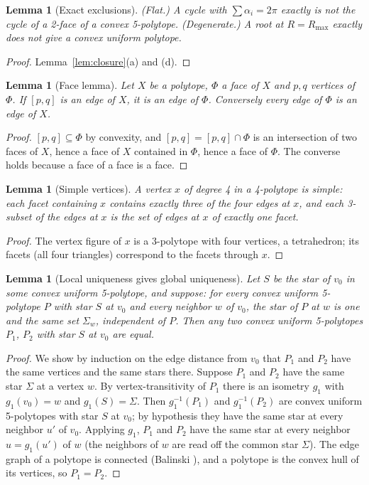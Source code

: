 \documentclass[11pt]{article}
\newtheorem{lemma}[theorem]{Lemma}
\theoremstyle{definition}
\theoremstyle{remark}
\begin{document}
\begin{appendices}
\begin{lemma}[Exact exclusions]\label{lem:exclusions}
\textup{(Flat.)} A cycle with $\sum\alpha_i=2\pi$ exactly is not the cycle
of a 2-face of a convex 5-polytope. \textup{(Degenerate.)} A root at
$R=R_{\max}$ exactly does not give a convex uniform polytope.
\end{lemma}
\begin{proof}
Lemma~\ref{lem:closure}(a) and (d).
\end{proof}


\begin{lemma}[Face lemma]\label{lem:face}
Let $X$ be a polytope, $\Phi$ a face of $X$ and $p,q$ vertices of
$\Phi$. If $[p,q]$ is an edge of $X$, it is an edge of $\Phi$. Conversely
every edge of $\Phi$ is an edge of $X$.
\end{lemma}
\begin{proof}
$[p,q]\subseteq\Phi$ by convexity, and $[p,q]=[p,q]\cap\Phi$ is an
intersection of two faces of $X$, hence a face of $X$ contained in
$\Phi$, hence a face of $\Phi$. The converse holds because a face of a
face is a face.
\end{proof}


\begin{lemma}[Simple vertices]\label{lem:simple}
A vertex $x$ of degree 4 in a 4-polytope is simple: each facet containing
$x$ contains exactly three of the four edges at $x$, and each 3-subset of
the edges at $x$ is the set of edges at $x$ of exactly one facet.
\end{lemma}
\begin{proof}
The vertex figure of $x$ is a 3-polytope with four vertices, a
tetrahedron; its facets (all four triangles) correspond to the facets
through $x$.
\end{proof}


\begin{lemma}[Local uniqueness gives global uniqueness]\label{lem:induction}
Let $S$ be the star of $v_0$ in some convex uniform 5-polytope, and
suppose: for every convex uniform 5-polytope $P$ with star $S$ at $v_0$
and every neighbor $w$ of $v_0$, the star of $P$ at $w$ is one and the
same set $\Sigma_w$, independent of $P$. Then any two convex uniform
5-polytopes $P_1$, $P_2$ with star $S$ at $v_0$ are equal.
\end{lemma}
\begin{proof}
We show by induction on the edge distance from $v_0$ that $P_1$ and $P_2$
have the same vertices and the same stars there. Suppose $P_1$ and $P_2$
have the same star $\Sigma$ at a vertex $w$. By vertex-transitivity of
$P_1$ there is an isometry $g_1$ with $g_1(v_0)=w$ and $g_1(S)=\Sigma$.
Then $g_1^{-1}(P_1)$ and $g_1^{-1}(P_2)$ are convex uniform 5-polytopes
with star $S$ at $v_0$; by hypothesis they have the same star at every
neighbor $u'$ of $v_0$. Applying $g_1$, $P_1$ and $P_2$ have the same
star at every neighbor $u=g_1(u')$ of $w$ (the neighbors of $w$ are
read off the common star $\Sigma$). The edge graph of a polytope is
connected (Balinski \cite{Balinski1961}), and a polytope is the convex
hull of its vertices, so $P_1=P_2$.
\end{proof}


\end{appendices}
\end{document}
